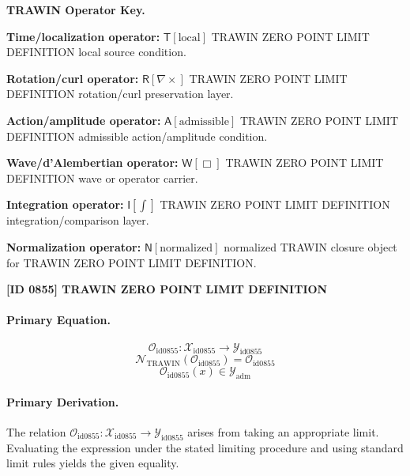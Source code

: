 \par\vspace{0.45\baselineskip}
\noindent\begin{minipage}[t]{\linewidth}
\begingroup
\small
\raggedright
\textbf{TRAWIN Operator Key.}\par
\noindent\textbf{Time/localization operator:} $\mathsf{T}\!\left[\mathrm{local}\right]$ TRAWIN ZERO POINT LIMIT DEFINITION local source condition.\par
\noindent\textbf{Rotation/curl operator:} $\mathsf{R}\!\left[\nabla\times\right]$ TRAWIN ZERO POINT LIMIT DEFINITION rotation/curl preservation layer.\par
\noindent\textbf{Action/amplitude operator:} $\mathsf{A}\!\left[\mathrm{admissible}\right]$ TRAWIN ZERO POINT LIMIT DEFINITION admissible action/amplitude condition.\par
\noindent\textbf{Wave/d'Alembertian operator:} $\mathsf{W}\!\left[\Box\right]$ TRAWIN ZERO POINT LIMIT DEFINITION wave or operator carrier.\par
\noindent\textbf{Integration operator:} $\mathsf{I}\!\left[\int\right]$ TRAWIN ZERO POINT LIMIT DEFINITION integration/comparison layer.\par
\noindent\textbf{Normalization operator:} $\mathsf{N}\!\left[\mathrm{normalized}\right]$ normalized TRAWIN closure object for TRAWIN ZERO POINT LIMIT DEFINITION.\par
\endgroup
\end{minipage}

\clearpage
\noindent\textbf{[ID 0855] TRAWIN ZERO POINT LIMIT DEFINITION}\par
\vspace{0.35em}
\paragraph{Primary Equation.}
\[
\mathcal{O}_{\mathrm{id0855}}:\mathcal{X}_{\mathrm{id0855}}\longrightarrow\mathcal{Y}_{\mathrm{id0855}}
\]
\[
\mathcal{N}_{\mathrm{TRAWIN}}(\mathcal{O}_{\mathrm{id0855}})=\mathcal{O}_{\mathrm{id0855}}
\]
\[
\mathcal{O}_{\mathrm{id0855}}(x)\in\mathcal{Y}_{\mathrm{adm}}
\]

\paragraph{Primary Derivation.}
The relation \( \mathcal{O}_{\mathrm{id0855}}:\mathcal{X}_{\mathrm{id0855}}\longrightarrow\mathcal{Y}_{\mathrm{id0855}} \) arises from taking an appropriate limit. Evaluating the expression under the stated limiting procedure and using standard limit rules yields the given equality.
